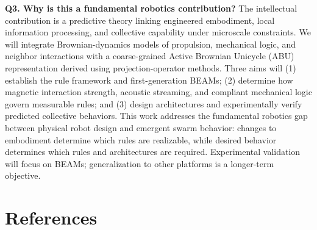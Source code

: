 \documentclass[11pt]{article}
\let\cite=\supercite
\begin{document}
\textbf{Q3. Why is this a fundamental robotics contribution?}
The intellectual contribution is a predictive theory linking engineered embodiment, local information processing, and collective capability under microscale constraints. We will integrate Brownian-dynamics models of propulsion, mechanical logic, and neighbor interactions with a coarse-grained Active Brownian Unicycle (ABU) representation derived using projection-operator methods. Three aims will (1) establish the rule framework and first-generation BEAMs; (2) determine how magnetic interaction strength, acoustic streaming, and compliant mechanical logic govern measurable rules; and (3) design architectures and experimentally verify predicted collective behaviors. This work addresses the fundamental robotics gap between physical robot design and emergent swarm behavior: changes to embodiment determine which rules are realizable, while desired behavior determines which rules and architectures are required. Experimental validation will focus on BEAMs; generalization to other platforms is a longer-term objective.\cite{Reynolds1987Boids,Vicsek1995SelfDrivenParticles,Couzin2002CollectiveMemory}


\section*{References}
\printbibliography[heading=none]
\end{document}
